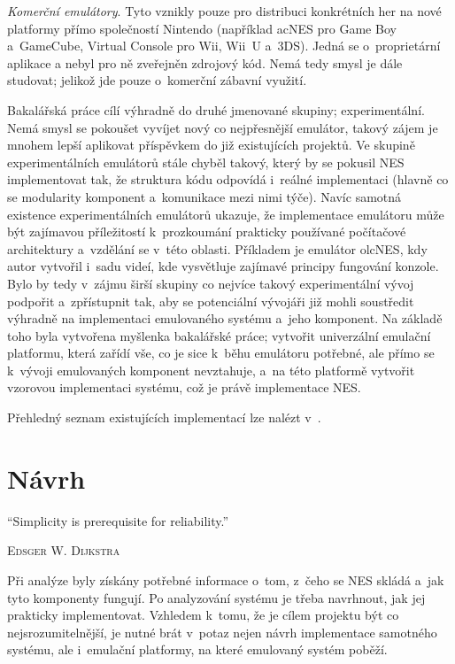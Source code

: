 \emph{Komerční emulátory}. Tyto vznikly pouze pro distribuci konkrétních her na nové platformy přímo společností Nintendo (například acNES pro Game Boy a~GameCube, Virtual Console pro Wii, Wii~U a~3DS). Jedná se o~proprietární aplikace a nebyl pro ně zveřejněn zdrojový kód. Nemá tedy smysl je dále studovat; jelikož jde pouze o~komerční zábavní využití.

Bakalářská práce cílí výhradně do druhé jmenované skupiny; experimentální. Nemá smysl se pokoušet vyvíjet nový co nejpřesnější emulátor, takový zájem je mnohem lepší aplikovat příspěvkem do již existujících projektů. Ve skupině experimentálních emulátorů stále chyběl takový, který by se pokusil NES implementovat tak, že struktura kódu odpovídá i~reálné implementaci (hlavně co se modularity komponent a~komunikace mezi nimi týče). Navíc samotná existence experimentálních emulátorů ukazuje, že implementace emulátoru může být zajímavou příležitostí k~prozkoumání prakticky používané počítačové architektury a~vzdělání se v~této oblasti. Příkladem je emulátor olcNES, kdy autor vytvořil i~sadu videí, kde vysvětluje zajímavé principy fungování konzole. Bylo by tedy v~zájmu širší skupiny co nejvíce takový experimentální vývoj podpořit a~zpřístupnit tak, aby se potenciální vývojáři již mohli soustředit výhradně na implementaci emulovaného systému a~jeho komponent. Na základě toho byla vytvořena myšlenka bakalářské práce; vytvořit univerzální emulační platformu, která zařídí vše, co je sice k~běhu emulátoru potřebné, ale přímo se k~vývoji emulovaných komponent nevztahuje, a~na této platformě vytvořit vzorovou implementaci systému, což je právě implementace NES.

Přehledný seznam existujících implementací lze nalézt v~\cite{Nesdev:emus}.

\chapter{Návrh}
\epigraph{
	\enquote{Simplicity is prerequisite for reliability.}
}{\textsc{Edsger W. Dijkstra}}

Při analýze byly získány potřebné informace o~tom, z~čeho se NES skládá a~jak tyto komponenty fungují. Po analyzování systému je třeba navrhnout, jak jej prakticky implementovat. Vzhledem k~tomu, že je cílem projektu být co nejsrozumitelnější, je nutné brát v~potaz nejen návrh implementace samotného systému, ale i~emulační platformy, na které emulovaný systém poběží.

